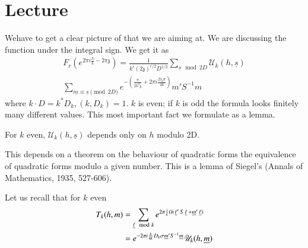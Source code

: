 \chapter{Lecture}\label{part4:lec45} %

We\pageoriginale have to get a clear picture of that we are aiming
at. We are discussing the function under the integral sign. We get it as
\begin{multline*}
  F_r \left(e^{2 \pi i \frac{h}{k} - 2 \pi \mathfrak{z}} \right) =
  \frac{1}{k^r (2\mathfrak{z})^{r/2} D^{1/2}} \sum_{\underline{s} \mod
  2D} \mathscr{U}_k (h, \underline{s})\\
  \sum_{\underline{m}\equiv \underline{s} \pmod{2D}} e^{-
    \left(\frac{\pi}{2k^2 \mathfrak{z}} + 2 \pi i \frac{D_k
      \sigma}{4k} \right)}  {m}' S^{-1} {m}
\end{multline*}
where $k \cdot D = k^* D_k, (k, D_k) =1$. $k$ is even; if $k$ is odd
the formula looks finitely many different values. This most important
fact we formulate as a lemma.

\begin{lem}\label{part4:lec45:lem1}
  For $k$ even, $\mathscr{U}_k (h, \underline{s})$ depends only on $h$
  modulo 2D.
\end{lem}

This depends on a theorem on the behaviour of quadratic forms the
equivalence of quadratic forms modulo a given number. This is a lemma
of Siegel's (Annals of Mathematics, 1935, 527-606).

Let us recall that for $k$ even
\begin{align*}
  T_k(h, m)& = \sum_{\underline{\ell} \mod k} e^{2 \pi \frac{i}{k} (h
    \operatorname{\underline{\ell}}' S\operatorname{\underline{\ell}} +
    \underline{m}'\operatorname{\underline{\ell}})}\\
  & = e^{- 2 \pi i\frac{h}{4k}  D_k \sigma \underline{m}' S^{-1}
    \underline{m}} \mathscr{U}_k (h, \underline{m})
\end{align*}

